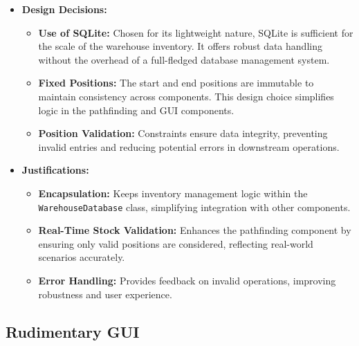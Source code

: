 \begin{itemize}
\item \textbf{Design Decisions:}
\begin{itemize}
    \item \textbf{Use of SQLite:} Chosen for its lightweight nature, SQLite is sufficient for the scale of the warehouse inventory. It offers robust data handling without the overhead of a full-fledged database management system.
    \item \textbf{Fixed Positions:} The start and end positions are immutable to maintain consistency across components. This design choice simplifies logic in the pathfinding and GUI components.
    \item \textbf{Position Validation:} Constraints ensure data integrity, preventing invalid entries and reducing potential errors in downstream operations.
\end{itemize}

\item \textbf{Justifications:}
\begin{itemize}
    \item \textbf{Encapsulation:} Keeps inventory management logic within the \verb|WarehouseDatabase| class, simplifying integration with other components.
    \item \textbf{Real-Time Stock Validation:} Enhances the pathfinding component by ensuring only valid positions are considered, reflecting real-world scenarios accurately.
    \item \textbf{Error Handling:} Provides feedback on invalid operations, improving robustness and user experience.
\end{itemize}
\end{itemize}

\newpage

\subsection{Rudimentary GUI}

